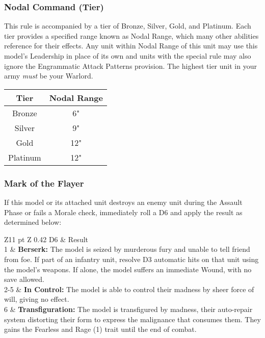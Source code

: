 \begin{multicols}{2}
\subsubsection{Nodal Command (Tier)} \label{Nodal Command}

This rule is accompanied by a tier of Bronze, Silver, Gold, and Platinum. Each tier provides a specified range known as Nodal Range, which many other abilities reference for their effects. Any unit within Nodal Range of this unit may use this model's Leadership in place of its own and units with the  special rule may also ignore the Engrammatic Attack Patterns provision. The highest tier unit in your army \textit{must} be your Warlord.

\label{Nodal Range}
\begin{tabular}{|c|c|}
	\hline
	Tier & Nodal Range \\
	\hline
	Bronze & 6" \\
	Silver & 9" \\
	Gold & 12" \\
	Platinum & 12" \\
	\hline
\end{tabular}

\subsubsection{Mark of the Flayer} \label{Mark of the Flayer}

If this model or its attached unit destroys an enemy unit during the Assault Phase or fails a Morale check, immediately roll a D6 and apply the result as determined below: \\
\begin{tabular}{Z{11 pt} Z {0.42\textwidth}}
	D6 & Result \\
	1 & \textbf{Berserk:} The model is seized by murderous fury and unable to tell friend from foe. If part of an infantry unit, resolve D3 automatic hits on that unit using the model's weapons. If alone, the model suffers an immediate Wound, with no save allowed. \\
	2-5 & \textbf{In Control:} The model is able to control their madness by sheer force of will, giving no effect. \\
	6 & \textbf{Transfiguration:} The model is transfigured by madness, their auto-repair system distorting their form to express the malignance that consumes them. They gains the Fearless and Rage (1) trait until the end of combat. \\
\end{tabular}



\end{multicols}
